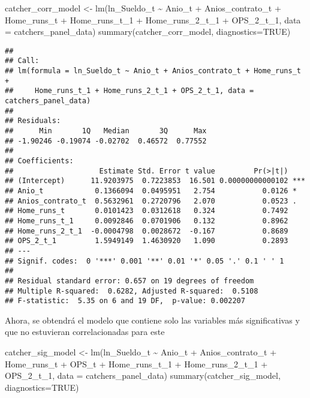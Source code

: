 \documentclass[
]{article}
\newenvironment{Shaded}{\begin{snugshade}}{\end{snugshade}}
\newcommand{\AttributeTok}[1]{\textcolor[rgb]{0.77,0.63,0.00}{#1}}
\newcommand{\ConstantTok}[1]{\textcolor[rgb]{0.00,0.00,0.00}{#1}}
\newcommand{\FunctionTok}[1]{\textcolor[rgb]{0.00,0.00,0.00}{#1}}
\newcommand{\NormalTok}[1]{#1}
\newcommand{\OtherTok}[1]{\textcolor[rgb]{0.56,0.35,0.01}{#1}}
\newcommand{\SpecialCharTok}[1]{\textcolor[rgb]{0.00,0.00,0.00}{#1}}
\begin{document}
\begin{Shaded}
\begin{Highlighting}[]
\NormalTok{catcher\_corr\_model }\OtherTok{\textless{}{-}} \FunctionTok{lm}\NormalTok{(ln\_Sueldo\_t }\SpecialCharTok{\textasciitilde{}}\NormalTok{ Anio\_t }\SpecialCharTok{+}\NormalTok{ Anios\_contrato\_t }\SpecialCharTok{+}\NormalTok{ Home\_runs\_t }\SpecialCharTok{+} 
\NormalTok{                                  Home\_runs\_t\_1 }\SpecialCharTok{+}\NormalTok{ Home\_runs\_2\_t\_1 }\SpecialCharTok{+}\NormalTok{ OPS\_2\_t\_1,}
                                  \AttributeTok{data =}\NormalTok{ catchers\_panel\_data)}
\FunctionTok{summary}\NormalTok{(catcher\_corr\_model, }\AttributeTok{diagnostics=}\ConstantTok{TRUE}\NormalTok{)}
\end{Highlighting}
\end{Shaded}

\begin{verbatim}
## 
## Call:
## lm(formula = ln_Sueldo_t ~ Anio_t + Anios_contrato_t + Home_runs_t + 
##     Home_runs_t_1 + Home_runs_2_t_1 + OPS_2_t_1, data = catchers_panel_data)
## 
## Residuals:
##      Min       1Q   Median       3Q      Max 
## -1.90246 -0.19074 -0.02702  0.46572  0.77552 
## 
## Coefficients:
##                    Estimate Std. Error t value         Pr(>|t|)    
## (Intercept)      11.9203975  0.7223853  16.501 0.00000000000102 ***
## Anio_t            0.1366094  0.0495951   2.754           0.0126 *  
## Anios_contrato_t  0.5632961  0.2720796   2.070           0.0523 .  
## Home_runs_t       0.0101423  0.0312618   0.324           0.7492    
## Home_runs_t_1     0.0092846  0.0701906   0.132           0.8962    
## Home_runs_2_t_1  -0.0004798  0.0028672  -0.167           0.8689    
## OPS_2_t_1         1.5949149  1.4630920   1.090           0.2893    
## ---
## Signif. codes:  0 '***' 0.001 '**' 0.01 '*' 0.05 '.' 0.1 ' ' 1
## 
## Residual standard error: 0.657 on 19 degrees of freedom
## Multiple R-squared:  0.6282, Adjusted R-squared:  0.5108 
## F-statistic:  5.35 on 6 and 19 DF,  p-value: 0.002207
\end{verbatim}

Ahora, se obtendrá el modelo que contiene solo las variables más
significativas y que no estuvieran correlacionadas para este

\begin{Shaded}
\begin{Highlighting}[]
\NormalTok{catcher\_sig\_model }\OtherTok{\textless{}{-}} \FunctionTok{lm}\NormalTok{(ln\_Sueldo\_t }\SpecialCharTok{\textasciitilde{}}\NormalTok{ Anio\_t }\SpecialCharTok{+}\NormalTok{ Anios\_contrato\_t }\SpecialCharTok{+}\NormalTok{ Home\_runs\_t }\SpecialCharTok{+}\NormalTok{ OPS\_t }\SpecialCharTok{+} 
\NormalTok{                                      Home\_runs\_t\_1 }\SpecialCharTok{+}\NormalTok{ Home\_runs\_2\_t\_1 }\SpecialCharTok{+}\NormalTok{ OPS\_2\_t\_1,}
                                      \AttributeTok{data =}\NormalTok{ catchers\_panel\_data)}
\FunctionTok{summary}\NormalTok{(catcher\_sig\_model, }\AttributeTok{diagnostics=}\ConstantTok{TRUE}\NormalTok{)}
\end{Highlighting}
\end{Shaded}
\end{document}
